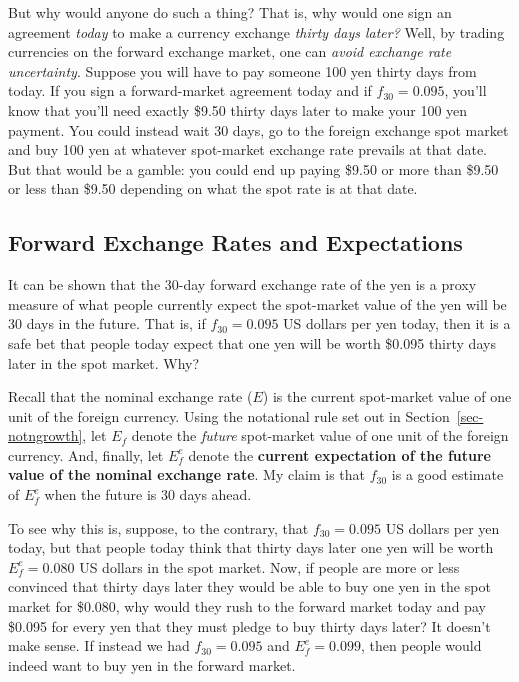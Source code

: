 \documentclass[
  letterpaper,
]{book}
\theoremstyle{plain}
\theoremstyle{remark}
\begin{document}
But why would anyone do such a thing? That is, why would one sign an
agreement \emph{today} to make a currency exchange \emph{thirty days
later?} Well, by trading currencies on the forward exchange market, one
can \emph{avoid exchange rate uncertainty}. Suppose you will have to pay
someone 100 yen thirty days from today. If you sign a forward-market
agreement today and if \(f_{30}=0.095\), you'll know that you'll need
exactly \$9.50 thirty days later to make your 100 yen payment. You could
instead wait 30 days, go to the foreign exchange spot market and buy 100
yen at whatever spot-market exchange rate prevails at that date. But
that would be a gamble: you could end up paying \$9.50 or more than
\$9.50 or less than \$9.50 depending on what the spot rate is at that
date.

\subsection{Forward Exchange Rates and
Expectations}\label{sec-forward-exp}

It can be shown that the 30-day forward exchange rate of the yen is a
proxy measure of what people currently expect the spot-market value of
the yen will be 30 days in the future. That is, if \(f_{30} = 0.095\) US
dollars per yen today, then it is a safe bet that people today expect
that one yen will be worth \$0.095 thirty days later in the spot market.
Why?

Recall that the nominal exchange rate (\(E\)) is the current spot-market
value of one unit of the foreign currency. Using the notational rule set
out in Section~\ref{sec-notngrowth}, let \(E_f\) denote the
\emph{future} spot-market value of one unit of the foreign currency.
And, finally, let \(E_f^e\) denote the \textbf{current expectation of
the future value of the nominal exchange rate}. My claim is that
\(f_{30}\) is a good estimate of \(E_f^e\) when the future is 30 days
ahead.

To see why this is, suppose, to the contrary, that \(f_{30} = 0.095\) US
dollars per yen today, but that people today think that thirty days
later one yen will be worth \(E_f^e =0.080\) US dollars in the spot
market. Now, if people are more or less convinced that thirty days later
they would be able to buy one yen in the spot market for \$0.080, why
would they rush to the forward market today and pay \$0.095 for every
yen that they must pledge to buy thirty days later? It doesn't make
sense. If instead we had \(f_{30} = 0.095\) and \(E_f^e =0.099\), then
people would indeed want to buy yen in the forward market.
\end{document}
